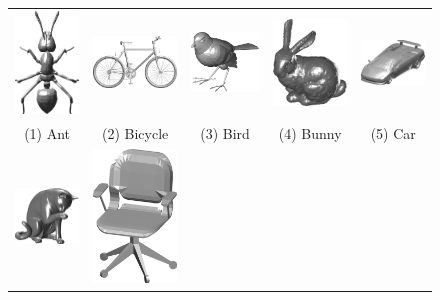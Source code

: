 \begin{figure}[ht!]
\center
\begin{tabular}{ccccc}
	\includegraphics[width=0.09\linewidth]{./fig/eval/01ant.png} \hspace{0mm} & 
	\includegraphics[width=0.15\linewidth]{./fig/eval/02bicycle.png} \hspace{0mm} & 
	\includegraphics[width=0.15\linewidth]{./fig/eval/03bird.png} \hspace{0mm} &
	\includegraphics[width=0.12\linewidth]{./fig/eval/04bunny.png} \hspace{0mm} &
	\includegraphics[width=0.15\linewidth]{./fig/eval/05car.png} \hspace{0mm} \\ 
	(1) Ant & (2) Bicycle & (3) Bird & (4) Bunny & (5) Car \\
	\includegraphics[width=0.15\linewidth]{./fig/eval/06cat.png} \hspace{0mm} & 
	\includegraphics[width=0.09\linewidth]{./fig/eval/07chair.png} \hspace{0mm} & 

\end{tabular}
\end{figure}
